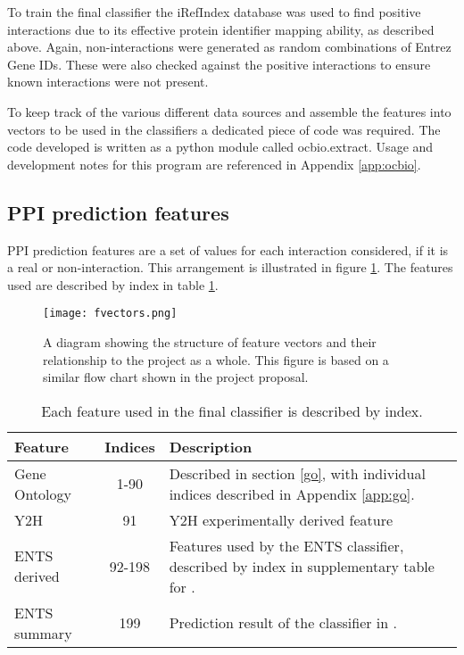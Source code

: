 To train the final classifier the iRefIndex\autocite{razick_irefindex:_2008} database was used to find positive interactions due to its effective protein identifier mapping ability, as described above.
Again, non-interactions were generated as random combinations of Entrez Gene IDs.
These were also checked against the positive interactions to ensure known interactions were not present.

To keep track of the various different data sources and assemble the features into vectors to be used in the classifiers a dedicated piece of code was required.
The code developed is written as a python module called ocbio.extract.
Usage and development notes for this program are referenced in Appendix \ref{app:ocbio}.

\subsection{\ac{PPI} prediction features}

\ac{PPI} prediction features are a set of values for each interaction considered, if it is a real or non-interaction.
This arrangement is illustrated in figure \ref{fig:fvectors}.
The features used are described by index in table \ref{tab:fvectors}.

\begin{figure}
    \centering
    \texttt{[image: fvectors.png]}
    \caption{A diagram showing the structure of feature vectors and their relationship to the project as a whole. This figure is based on a similar flow chart shown in the project proposal.}
    \label{fig:fvectors}
\end{figure}

\begin{table}
    \centering
    \begin{tabular}{l c p{}}
        Feature         & Indices & Description \\
        \hline
        Gene Ontology   & 1-90    & Described in section \ref{go}, with individual indices described in Appendix \ref{app:go}. \\
        Y2H             & 91      & Y2H experimentally derived feature \\
        ENTS derived    & 92-198  & Features used by the ENTS classifier, described by index in supplementary table for \textcite{rodgers-melnick_predicting_2013}. \\
        ENTS summary    & 199     & Prediction result of the classifier in \textcite{rodgers-melnick_predicting_2013}. \\
    \end{tabular}
    \caption{Each feature used in the final classifier is described by index.}
    \label{tab:fvectors}
\end{table}

